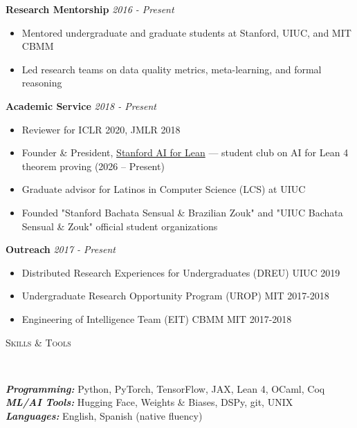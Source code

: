 \documentclass{article}
\newenvironment{changemargin}[2]{%
  \begin{list}{}{%
    \setlength{\topsep}{0pt}%
    \setlength{\leftmargin}{#1}%
    \setlength{\rightmargin}{#2}%
    \setlength{\listparindent}{\parindent}%
    \setlength{\itemindent}{\parindent}%
    \setlength{\parsep}{\parskip}%
  }%
  \item[]}{\end{list}
}
\newcommand{\lineover}{
	\begin{changemargin}{-0.05in}{-0.05in}
		\vspace*{-8pt}
		\hrulefill \\
		\vspace*{-2pt}
	\end{changemargin}
}
\newcommand{\header}[1]{
	\begin{changemargin}{-0.5in}{-0.5in}
		\scshape{#1}\\
  	\lineover
	\end{changemargin}
}
\newenvironment{body} {
	\vspace*{-16pt}
	\begin{changemargin}{-0.25in}{-0.5in}
  }	
	{\end{changemargin}
}
\begin{document}
\begin{body}
    \vspace{11pt}

\textbf{Research Mentorship} \hfill \emph{2016 - Present}\\
\vspace*{-3pt}
\begin{itemize} \itemsep -2pt
    \item Mentored undergraduate and graduate students at Stanford, UIUC, and MIT CBMM
    \item Led research teams on data quality metrics, meta-learning, and formal reasoning
\end{itemize}
\vspace{5 pt}

\textbf{Academic Service} \hfill \emph{2018 - Present}\\
\vspace*{-3pt}
\begin{itemize} \itemsep -2pt
    \item Reviewer for ICLR 2020, JMLR 2018
    \item Founder \& President, \href{https://aiforlean.org}{Stanford AI for Lean} --- student club on AI for Lean 4 theorem proving (2026 -- Present)
    \item Graduate advisor for Latinos in Computer Science (LCS) at UIUC
    \item Founded "Stanford Bachata Sensual \& Brazilian Zouk" and "UIUC Bachata Sensual \& Zouk" official student organizations
\end{itemize}
\vspace{5 pt}

\textbf{Outreach} \hfill \emph{2017 - Present}\\
\vspace*{-3pt}
\begin{itemize} \itemsep -2pt
    \item Distributed Research Experiences for Undergraduates (DREU) UIUC 2019
    \item Undergraduate Research Opportunity Program (UROP) MIT 2017-2018 
    \item Engineering of Intelligence Team (EIT) CBMM MIT 2017-2018
\end{itemize}

\end{body}


\header{Skills \& Tools}
\begin{body}
	\vspace{14pt}
	\emph{\textbf{Programming:}}{} Python, PyTorch, TensorFlow, JAX, Lean 4, OCaml, Coq\\
	\smallskip
	\emph{\textbf{ML/AI Tools:}}{}  Hugging Face, Weights \& Biases, DSPy, git, UNIX\\
	\smallskip
	\emph{\textbf{Languages:}}{} English, Spanish (native fluency)\\
\end{body}
\end{document}
